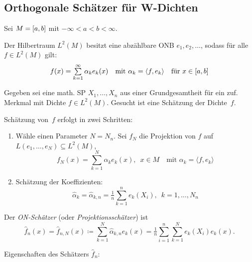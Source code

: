 \documentclass{cheat-sheet}
\newcommand{\scp}[2]{\langle #1, #2 \rangle} %
\begin{document}

\subsection{Orthogonale Schätzer für W-Dichten}

\begin{voraussetzung}
  Sei $M = \left[ a, b \right]$ mit $- \infty < a < b < \infty$.
\end{voraussetzung}

\begin{bem}
  Der Hilbertraum $L^2(M)$ besitzt eine abzählbare ONB $e_1, e_2, \ldots$, sodass für alle $f \in L^2(M)$ gilt:
  \[
    f(x) = \sum_{k=1}^\infty \alpha_k e_k(x)
    \quad \text{mit } \alpha_k = \scp{f}{e_k}
    \quad \text{für } x \in \cinterval{a}{b}
  \]
\end{bem}

\begin{problem}
  Gegeben sei eine math. SP $X_1, \ldots, X_n$ aus einer Grundgesamtheit für ein zuf. Merkmal mit Dichte $f \in L^2(M)$.
  Gesucht ist eine Schätzung der Dichte~$f$.
\end{problem}

\begin{verf}
  Schätzung von~$f$ erfolgt in zwei Schritten:
  \begin{enumerate}
    \item Wähle einen Parameter $N = N_n$.
    Sei $f_N$ die Projektion von $f$ auf $L(e_1, \ldots, e_N) \subseteq L^2(M)$,
    \[
      f_N(x) = \sum_{k=1}^N \alpha_k e_k(x), \enspace x \in M
      \quad \text{mit } \alpha_k = \scp{f}{e_k}
    \]
    \item Schätzung der Koeffizienten:
    \[
      \hat{\alpha}_k = \hat{\alpha}_{k,n} = \tfrac{1}{n} \sum_{k=1}^n e_k(X_i), \enspace k = 1, \ldots, N_n
    \]
  \end{enumerate}
\end{verf}

\begin{defn}
  Der \emph{ON-Schätzer} (oder \textit{Projektionsschätzer}) ist
  \[
    \hat{f}_n (x) = \hat{f}_{n,N} (x) \coloneqq \sum_{k=1}^N \hat{\alpha}_{k,n} e_k(x) = \tfrac{1}{n} \sum_{i=1}^n \sum_{k=1}^N e_k(X_i) e_k(x).
  \]
\end{defn}

Eigenschaften des Schätzers $\hat{f}_n$:

\end{document}
